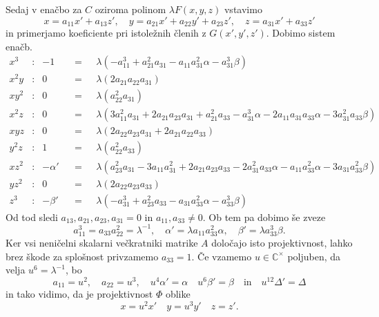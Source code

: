 \documentclass[mat1]{fmfdelo}
\newcommand{\CM}{\mathbb C ^\times}
\newcommand{\inv}{^{-1}}
\theoremstyle{definition}
\begin{document}
\begin{dokaz}
    Sedaj v enačbo za $C$ oziroma polinom $\lambda F(x,y,z)$ vstavimo 
    \[
        x = a_{11}x' + a_{13}z', \quad y = a_{21}x' + a_{22}y' + a_{23}z', \quad z = a_{31}x' + a_{33}z' 
    \]
    in primerjamo koeficiente pri istoležnih členih z $G(x', y', z')$. Dobimo sistem enačb.
    \begin{align*}
        x^3 &: & -1 && = \text{ }& \lambda (-a_{11}^3 + a_{21}^2 a_{31} - a_{11} a_{31}^2 \alpha - a_{31}^3 \beta) \\
        x^2y &: & 0 && = \text{ }& \lambda (2 a_{21} a_{22} a_{31}) \\
        xy^2 &: & 0 && = \text{ }& \lambda (a_{22}^2 a_{31}) \\
        x^2z &: & 0 && = \text{ }& \lambda (3 a_{11}^2 a_{31} + 2 a_{21} a_{23} a_{31} + a_{21}^2 a_{33} - 
        a_{31}^3 \alpha - 2 a_{11} a_{31} a_{33} \alpha - 3 a_{31}^2 a_{33} \beta) \\
        xyz  &: & 0 && = \text{ }& \lambda (2 a_{22} a_{23} a_{31} + 2 a_{21} a_{22} a_{33}) \\
        y^2z &: & 1 && = \text{ }& \lambda (a_{22}^2 a_{33}) \\
        xz^2 &: & -\alpha' && = \text{ }& \lambda (a_{23}^2 a_{31} - 3 a_{11} a_{31}^2 + 2 a_{21} a_{23} a_{33} - 
        2 a_{31}^2 a_{33} \alpha - a_{11} a_{33}^2 \alpha - 3 a_{31} a_{33}^2 \beta) \\
        yz^2 &: & 0 && = \text{ }& \lambda (2 a_{22} a_{23} a_{33} ) \\
        z^3 &: & -\beta' && = \text{ }& \lambda (-a_{31}^3 + a_{23}^2 a_{33} - a_{31} a_{33}^2 \alpha - a_{33}^3 \beta)
    \end{align*}
    Od tod sledi $a_{13}, a_{21}, a_{23}, a_{31} = 0$ in $a_{11}, a_{33} \neq 0$. Ob tem pa dobimo še zveze
    \[
        a_{11}^3 = a_{33}a_{22}^2 = \lambda\inv, \quad \alpha' = \lambda a_{11}a_{33}^2 \alpha, \quad \beta' = \lambda a_{33}^3 \beta.
    \]
    Ker vsi neničelni skalarni večkratniki matrike $A$ določajo isto projektivnost, lahko brez škode za splošnost privzamemo $a_{33} = 1$. Če vzamemo $u \in \CM$ poljuben, da velja $u^6 = \lambda\inv$, bo 
    \[
        a_{11} = u^2, \quad a_{22} = u^3, \quad u^4\alpha' = \alpha \quad u^6 \beta' = \beta \quad \text{in} \quad u^{12} \Delta' = \Delta
    \]
    in tako vidimo, da je projektivnost $\Phi$ oblike
    \[
        x = u^2 x' \quad y = u^3 y' \quad z = z'.
    \]
\end{dokaz}
\end{document}
